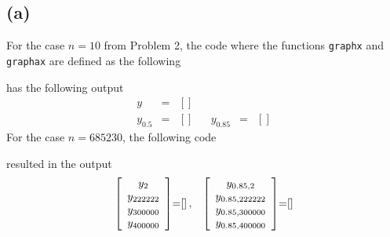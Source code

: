 \documentclass[11pt]{article}
\theoremstyle{definition}
\theoremstyle{remark}
\newcommand{\newpart}{\vspace{-0.5\baselineskip}\hrulefill\vspace{-1.3\baselineskip}}
\theoremstyle{plain}
\begin{document}
\subsection*{(a)}
For the case $n=10$ from Problem 2, the code
\newpage
where the functions \texttt{graphx} and \texttt{graphax} are defined as the following


has the following output
\begin{equation*}
  \begin{array}{rclcrcl}
    y&=&\left[\right]\\
    y_{0.5}&=&\left[\right]&&y_{0.85}&=&\left[\right]
  \end{array}
\end{equation*}
For the case $n=685230$, the following code

resulted in the output
\begin{equation*}
  \begin{array}{c@{\hspace{0cm}}c@{\hspace{0cm}}lc@{\hspace{0cm}}c@{\hspace{0cm}}l}
    \left[
    \begin{array}{c}
      y_2\\
      y_{222222}\\
      y_{300000}\\
      y_{400000}\\
    \end{array}
    \right]&=&\left[\right],&
                                                    \left[
                                                    \begin{array}{c}
                                                      y_{0.85,2}\\
                                                      y_{0.85,222222}\\
                                                      y_{0.85,300000}\\
                                                      y_{0.85,400000}\\
                                                    \end{array}
    \right]&=&\left[\right]
  \end{array}
\end{equation*}
\newpart
\end{document}
